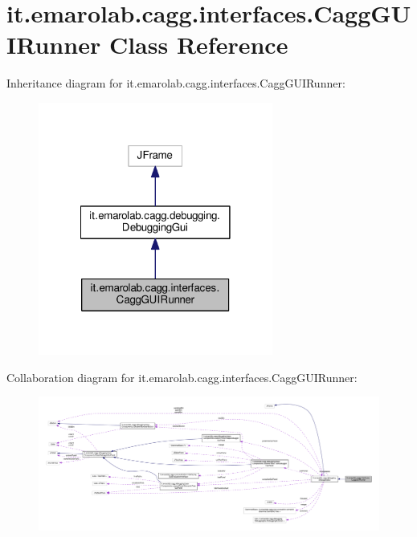 \hypertarget{classit_1_1emarolab_1_1cagg_1_1interfaces_1_1CaggGUIRunner}{\section{it.\-emarolab.\-cagg.\-interfaces.\-Cagg\-G\-U\-I\-Runner Class Reference}
\label{classit_1_1emarolab_1_1cagg_1_1interfaces_1_1CaggGUIRunner}
}


Inheritance diagram for it.\-emarolab.\-cagg.\-interfaces.\-Cagg\-G\-U\-I\-Runner\-:\nopagebreak
\begin{figure}[H]
\begin{center}
\leavevmode
\includegraphics[width=218pt]{classit_1_1emarolab_1_1cagg_1_1interfaces_1_1CaggGUIRunner__inherit__graph}
\end{center}
\end{figure}


Collaboration diagram for it.\-emarolab.\-cagg.\-interfaces.\-Cagg\-G\-U\-I\-Runner\-:\nopagebreak
\begin{figure}[H]
\begin{center}
\leavevmode
\includegraphics[width=350pt]{classit_1_1emarolab_1_1cagg_1_1interfaces_1_1CaggGUIRunner__coll__graph}
\end{center}
\end{figure}
